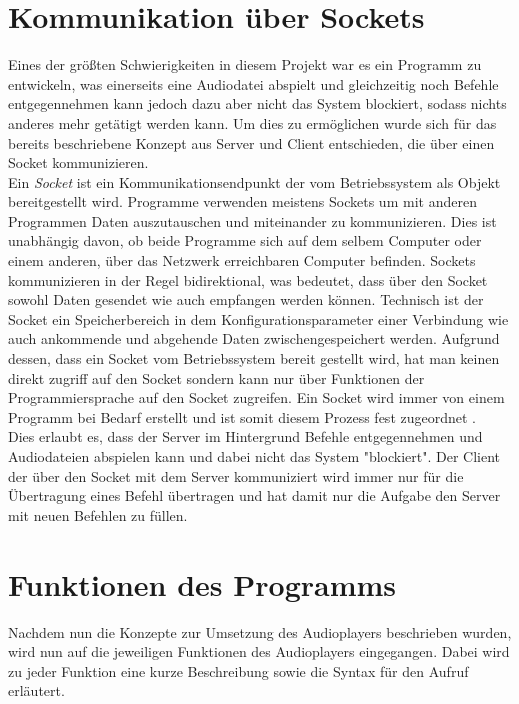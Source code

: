 \section{Kommunikation über Sockets}
Eines der größten Schwierigkeiten in diesem Projekt war es ein Programm zu
entwickeln, was einerseits eine Audiodatei abspielt und gleichzeitig noch
Befehle entgegennehmen kann jedoch dazu aber nicht das System blockiert, sodass
nichts anderes mehr getätigt werden kann. Um dies zu ermöglichen wurde sich für
das bereits beschriebene Konzept aus Server und Client entschieden, die über
einen Socket kommunizieren. \\
Ein \textit{Socket} ist ein Kommunikationsendpunkt der vom Betriebssystem als
Objekt bereitgestellt wird. Programme verwenden meistens Sockets um mit anderen
Programmen Daten auszutauschen und miteinander zu kommunizieren. Dies ist
unabhängig davon, ob beide Programme sich auf dem selbem Computer oder einem
anderen, über das Netzwerk erreichbaren Computer befinden. Sockets
kommunizieren in der Regel bidirektional, was bedeutet, dass über den Socket
sowohl Daten gesendet wie auch empfangen werden können. Technisch ist der
Socket ein Speicherbereich in dem Konfigurationsparameter einer Verbindung wie
auch ankommende und abgehende Daten zwischengespeichert werden. Aufgrund
dessen, dass ein Socket vom Betriebssystem bereit gestellt wird, hat man keinen
direkt zugriff auf den Socket sondern kann nur über Funktionen der
Programmiersprache auf den Socket zugreifen.
Ein Socket wird immer von einem Programm bei Bedarf erstellt und ist somit
diesem Prozess fest zugeordnet \autocite{pollakowski_2012}. \\
Dies erlaubt es, dass der Server im Hintergrund Befehle entgegennehmen und
Audiodateien abspielen kann und dabei nicht das System "blockiert". Der Client
der über den Socket mit dem Server kommuniziert wird immer nur für die
Übertragung eines Befehl übertragen und hat damit nur die Aufgabe den Server
mit neuen Befehlen zu füllen.

\section{Funktionen des Programms}
Nachdem nun die Konzepte zur Umsetzung des Audioplayers beschrieben wurden,
wird nun auf die jeweiligen Funktionen des Audioplayers eingegangen. Dabei wird
zu jeder Funktion eine kurze Beschreibung sowie die Syntax für den Aufruf
erläutert.

